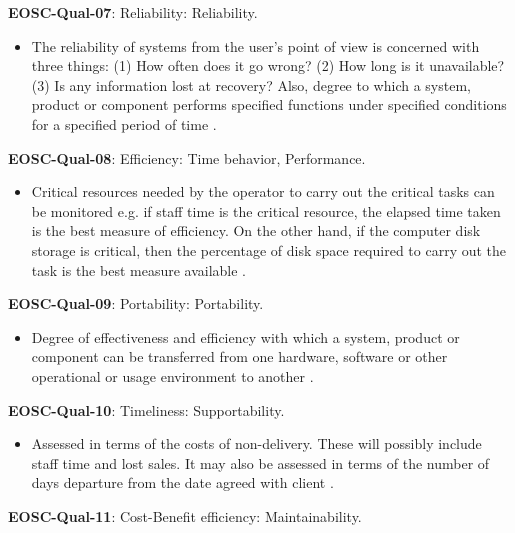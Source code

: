\textbf{EOSC-Qual-07}: Reliability: Reliability.

\begin{itemize}
    \item The reliability of systems from the user's point of view is concerned with three things: (1) How often does it go wrong? (2) How long is it unavailable? (3) Is any information lost at recovery? Also, degree to which a system, product or component performs specified functions under specified conditions for a specified period of time \cite{iso_25010_2011_2017,gillies_modelling_1992,boehm_quantitative_1976}.
\end{itemize}

\textbf{EOSC-Qual-08}: Efficiency: Time behavior, Performance.

\begin{itemize}
    \item Critical resources needed by the operator to carry out the critical tasks can be monitored e.g. if staff time is the critical resource, the elapsed time taken is the best measure of efficiency. On the other hand, if the computer disk storage is critical, then the percentage of disk space required to carry out the task is the best measure available \cite{iso_25010_2011_2017,gillies_modelling_1992,boehm_quantitative_1976}.
\end{itemize}

\textbf{EOSC-Qual-09}: Portability: Portability.

\begin{itemize}
    \item Degree of effectiveness and efficiency with which a system, product or component can be transferred from one hardware, software or other operational or usage environment to another \cite{iso_25010_2011_2017,gillies_modelling_1992,boehm_quantitative_1976,shepherdson_cessda_2019,raymond_software_2013}.
\end{itemize}

\textbf{EOSC-Qual-10}: Timeliness: Supportability.

\begin{itemize}
    \item Assessed in terms of the costs of non-delivery. These will possibly include staff time and lost sales. It may also be assessed in terms of the number of days departure from the date agreed with client \cite{gillies_modelling_1992}.
\end{itemize}

\textbf{EOSC-Qual-11}: Cost-Benefit efficiency: Maintainability.

